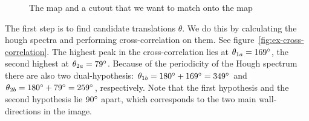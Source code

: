 \begin{figure}[h]
\centering
{}
\caption{The map and a cutout that we want to match onto the map}
\label{fig:ex-rooms}
\end{figure}

The first step is to find candidate translations $\theta$. We do this by calculating the hough spectra and performing cross-correlation on them. See figure~\ref{fig:ex-cross-correlation}. The highest peak in the cross-correlation lies at $\theta_{1a} = 169\degree$, the second highest at $\theta_{2a} = 79\degree$. Because of the periodicity of the Hough spectrum there are also two dual-hypothesis: $\theta_{1b} = 180\degree+169\degree = 349\degree$ and $\theta_{2b} = 180\degree+79\degree = 259\degree$, respectively. Note that the first hypothesis and the second hypothesis lie $90\degree$ apart, which corresponds to the two main wall-directions in the image.

